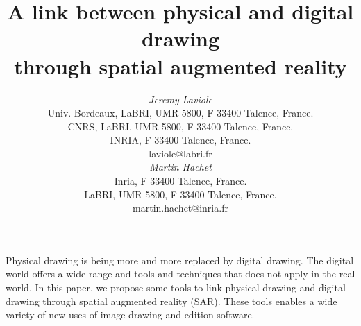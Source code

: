 \documentclass{article}
\begin{document}




\title{A link between physical and digital drawing \\
       through spatial augmented reality}


\author{
\parbox[t]{9cm}{\centering
	     {\em Jeremy Laviole}\\
  \small Univ. Bordeaux, LaBRI, UMR 5800, F-33400 Talence, France.\\
  \small CNRS, LaBRI, UMR 5800, F-33400 Talence, France.\\
  \small INRIA, F-33400 Talence, France.\\
	     laviole@labri.fr}
\parbox[t]{9cm}{\centering
	     {\em Martin Hachet}\\
\small	     Inria, F-33400 Talence, France.\\
	     LaBRI, UMR 5800, F-33400 Talence, France.\\
	     martin.hachet@inria.fr}
}

\maketitle

\abstract

Physical drawing is being more and more replaced by digital drawing. The digital world offers a wide range and tools and techniques that does not apply in the real world. In this paper, we propose some tools to link physical drawing and digital drawing through spatial augmented reality (SAR). These tools enables a wide variety of new uses of image drawing and edition software.
\end{document}
